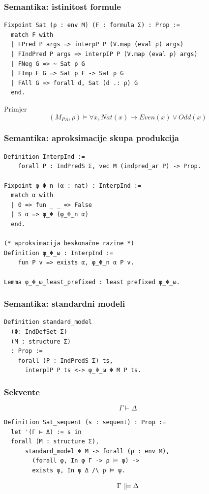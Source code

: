 \documentclass{beamer}
\DeclareRobustCommand{\VDash}{\mathrel{||}\joinrel\Relbar}
\begin{document}
\begin{frame}[fragile]
  \frametitle{Semantika: istinitost formule}
  \begin{footnotesize}
\begin{verbatim}
Fixpoint Sat (ρ : env M) (F : formula Σ) : Prop :=
  match F with
  | FPred P args => interpP P (V.map (eval ρ) args)
  | FIndPred P args => interpIP P (V.map (eval ρ) args)
  | FNeg G => ~ Sat ρ G
  | FImp F G => Sat ρ F -> Sat ρ G
  | FAll G => forall d, Sat (d .: ρ) G
  end.
\end{verbatim}
  \end{footnotesize}
  \begin{block}{Primjer}
    \[
      (M_{\mathit{PA}}, \rho) \vDash \forall x, \mathit{Nat}(x) \rightarrow \mathit{Even}(x) \lor \mathit{Odd}(x)
    \]
  \end{block}
\end{frame}

\begin{frame}[fragile]
  \frametitle{Semantika: aproksimacije skupa produkcija}
  \begin{footnotesize}
\begin{verbatim}
Definition InterpInd :=
    forall P : IndPredS Σ, vec M (indpred_ar P) -> Prop.

Fixpoint φ_Φ_n (α : nat) : InterpInd :=
  match α with
  | 0 => fun _ _ => False
  | S α => φ_Φ (φ_Φ_n α)
  end.

(* aproksimacija beskonačne razine *)
Definition φ_Φ_ω : InterpInd :=
    fun P v => exists α, φ_Φ_n α P v.

Lemma φ_Φ_ω_least_prefixed : least prefixed φ_Φ_ω.
\end{verbatim}
  \end{footnotesize}
\end{frame}

\begin{frame}[fragile]
  \frametitle{Semantika: standardni modeli}
\begin{verbatim}
Definition standard_model
  (Φ: IndDefSet Σ)
  (M : structure Σ)
  : Prop :=
    forall (P : IndPredS Σ) ts,
      interpIP P ts <-> φ_Φ_ω Φ M P ts.
\end{verbatim}
\end{frame}

\begin{frame}[fragile]
  \frametitle{Sekvente}

  \begin{block}{}
    \[
      \Gamma \vdash \Delta
    \]
  \end{block}

\begin{verbatim}
Definition Sat_sequent (s : sequent) : Prop :=
  let '(Γ ⊢ Δ) := s in            
  forall (M : structure Σ),
      standard_model Φ M -> forall (ρ : env M),
        (forall φ, In φ Γ -> ρ ⊨ φ) ->
        exists ψ, In ψ Δ /\ ρ ⊨ ψ.
\end{verbatim}
  \begin{block}{}
    \[
      \Gamma \VDash \Delta
    \]
  \end{block}
\end{frame}
\end{document}
